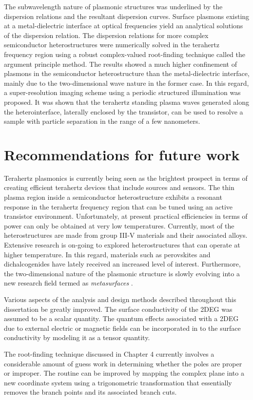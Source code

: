 The subwavelength nature of plasmonic structures was underlined by the dispersion relations and the resultant dispersion curves. Surface plasmons existing at a metal-dielectric interface at optical frequencies yield an analytical solutions of the dispersion relation. The dispersion relations for more complex semiconductor heterostructures were numerically solved in the terahertz frequency region using a robust complex-valued root-finding technique called the argument principle method. The results showed a much higher confinement of plasmons in the semiconductor heterostructure than the metal-dielectric interface, mainly due to the two-dimensional wave nature in the former case. In this regard, a super-resolution imaging scheme using a periodic structured illumination was proposed. It was shown that the terahertz standing plasma waves generated along the heterointerface, laterally enclosed by the transistor, can be used to resolve a sample with particle separation in the range of a few nanometers.

\section*{Recommendations for future work}
%
%
Terahertz plasmonics is currently being seen as the brightest prospect in terms of creating efficient terahertz devices that include sources and sensors. The thin plasma region inside a semiconductor heterostructure exhibits a resonant response in the terahertz frequency region that can be tuned using an active transistor environment. Unfortunately, at present practical efficiencies in terms of power can only be obtained at very low temperatures. Currently, most of the heterostructures are made from group III-V materials and their associated alloys. Extensive research is on-going to explored heterostructures that can operate at higher temperature. In this regard, materials such as perovskites and dichalcogenides have lately received an increased level of interest. Furthermore, the two-dimensional nature of the plasmonic structure is slowly evolving into a new research field termed as \emph{metasurfaces} \cite{Zhao_2011,Pors_2013}.

Various aspects of the analysis and design methods described throughout this dissertation be greatly improved. The surface conductivity of the 2DEG was assumed to be a scalar quantity. The quantum effects associated with a 2DEG due to external electric or magnetic fields can be incorporated in to the surface conductivity by modeling it as a tensor quantity.

The root-finding technique discussed in Chapter 4 currently involves a considerable amount of guess work in determining whether the poles are proper or improper. The routine can be improved by mapping the complex plane into a new coordinate system using a trigonometric transformation that essentially removes the branch points and its associated branch cuts.
